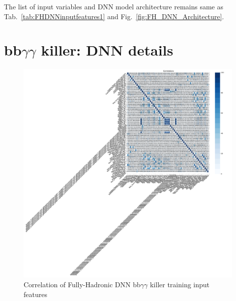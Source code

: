 The list of input variables and DNN model architecture remains same as
Tab.~\ref{tab:FHDNNinputfeatures1} and Fig.~\ref{fig:FH_DNN_Architecture}.

\clearpage
\section{\texorpdfstring{bb$\gamma\gamma$}{bbyy} killer: DNN details}

\begin{figure}[!htbp]
    \includegraphics[width=\textwidth,trim={17cm 17cm 0 0},clip=true]{Sections/HHWWgg/images/FH_DNN/EFT/HHWWyyDNN_binary_BBggAsSignal_E500_B250_BalanceYields/correlation_plot.pdf}
    \caption{Correlation of Fully-Hadronic DNN bb$\gamma \gamma$ killer training input features}
    \label{fig:FH_DNN_CorrelationPlot_bbgg}
\end{figure}

